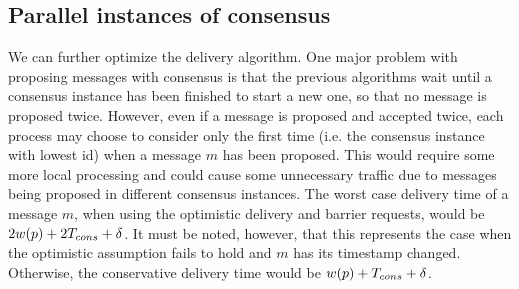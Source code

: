 \documentclass[times, 10pt]{article}
\begin{document}
% 
% 
% 
% 
% 



\subsection{Parallel instances of consensus}

We can further optimize the delivery algorithm. One major problem with proposing messages with consensus is that the previous algorithms wait until a consensus instance has been finished to start a new one, so that no message is proposed twice. However, even if a message is proposed and accepted twice, each process may choose to consider only the first time (i.e. the consensus instance with lowest id) when a message $m$ has been proposed. This would require some more local processing and could cause some unnecessary traffic due to messages being proposed in different consensus instances. The worst case delivery time of a message $m$, when using the optimistic delivery and barrier requests, would be $2w(p) + 2T_{cons} + \delta$. It must be noted, however, that this represents the case when the optimistic assumption fails to hold and $m$ has its timestamp changed. Otherwise, the conservative delivery time would be $w(p) + T_{cons} + \delta$.
\end{document}
